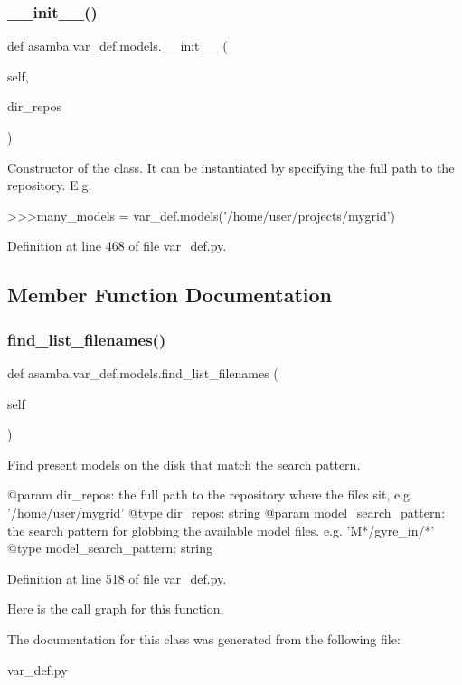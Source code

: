 \subsubsection{\texorpdfstring{\+\_\+\+\_\+init\+\_\+\+\_\+()}{\_\_init\_\_()}}
{\footnotesize\ttfamily def asamba.\+var\+\_\+def.\+models.\+\_\+\+\_\+init\+\_\+\+\_\+ (\begin{DoxyParamCaption}\item[{}]{self,  }\item[{}]{dir\+\_\+repos }\end{DoxyParamCaption})}

\begin{DoxyVerb}Constructor of the class. It can be instantiated by specifying the full path to the repository. 
E.g.

>>>many_models = var_def.models('/home/user/projects/mygrid')\end{DoxyVerb}
 

Definition at line 468 of file var\+\_\+def.\+py.



\subsection{Member Function Documentation}
\mbox{\label{classasamba_1_1var__def_1_1models_ae0babd86feff61275e38952a7cc23282}} 
\subsubsection{\texorpdfstring{find\+\_\+list\+\_\+filenames()}{find\_list\_filenames()}}
{\footnotesize\ttfamily def asamba.\+var\+\_\+def.\+models.\+find\+\_\+list\+\_\+filenames (\begin{DoxyParamCaption}\item[{}]{self }\end{DoxyParamCaption})}

\begin{DoxyVerb}Find present models on the disk that match the search pattern.

@param dir_repos: the full path to the repository where the files sit, e.g. '/home/user/mygrid'
@type dir_repos: string
@param model_search_pattern: the search pattern for globbing the available model files. e.g.
  'M*/gyre_in/*'
@type model_search_pattern: string
\end{DoxyVerb}
 

Definition at line 518 of file var\+\_\+def.\+py.

Here is the call graph for this function\+:


The documentation for this class was generated from the following file\+:\begin{DoxyCompactItemize}
\item 
var\+\_\+def.\+py\end{DoxyCompactItemize}
